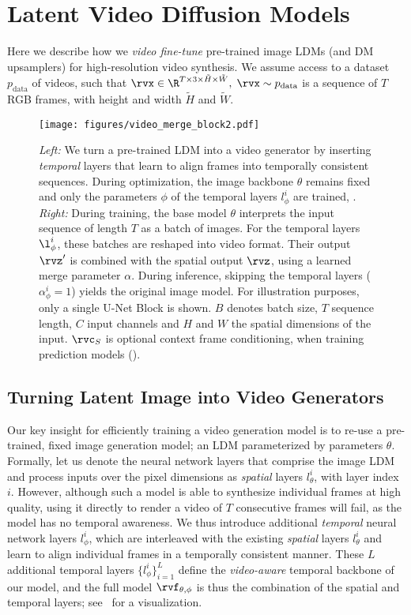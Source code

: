 \section{Latent Video Diffusion Models}\label{sec:video_ldm}
Here we describe how we \emph{video fine-tune} pre-trained image LDMs (and DM upsamplers) for high-resolution video synthesis. We assume access to a dataset $p_{\text{data}}$ of videos, such that $\rvx \in \R^{T \times 3 \times \tilde{H} \times \tilde{W}}, \; \rvx \sim p_{\text{data}}$ is a sequence of $T$ RGB frames, with height and width $\tilde{H}$ and $\tilde{W}$.
\begin{figure}[t!]
  \vspace{-0.3cm}
    \texttt{[image: figures/video\_merge\_block2.pdf]}
    \caption{\small \textit{Left:} We turn a pre-trained LDM into a video generator by inserting \emph{temporal} layers that learn to align frames into temporally consistent sequences. During optimization, the image backbone $\theta$ remains fixed and only the parameters $\phi$ of the temporal layers $l_\phi^i$ are trained, \cf {}. \textit{Right:}
During training, the base model $\theta$ interprets the input sequence of length $T$ as a batch of images. For the temporal layers $\l_\phi^i$, these batches are reshaped into video format. Their output $\rvz'$ is combined with the spatial output $\rvz$, using a learned merge parameter $\alpha$.
During inference, skipping the temporal layers ($\alpha_\phi^i{=}1$)  yields the original image model.
    For illustration purposes, only a single U-Net Block is shown.
    $B$ denotes batch size, $T$ sequence length, $C$ input channels and $H$ and $W$ the spatial dimensions of the input. $\rvc_S$ is optional context frame conditioning, when training prediction models ().
    } 
    \label{fig:architecture}

   \vspace{-5.5mm}
\end{figure}\subsection{Turning Latent Image into Video Generators}
\label{sec:turning}
Our key insight for efficiently training a video generation model is to re-use a pre-trained, fixed image generation model; an LDM parameterized by parameters $\theta$. Formally, let us denote the neural network layers that comprise the image LDM and process inputs over the pixel dimensions as \emph{spatial} layers $l_\theta^i$, with layer index $i$.
However, although such a model is able to synthesize individual frames at high quality, using it directly to render a video of $T$ consecutive frames will fail, as the model has no temporal awareness. 
We thus introduce additional \emph{temporal} neural network layers $l_\phi^i$, which are interleaved with the existing \emph{spatial} layers $l_\theta^i$ and learn to align individual frames in a temporally consistent manner. These $L$ additional temporal layers $\{l_\phi^i\}_{i=1}^L$ define the \emph{video-aware} temporal backbone of our model, and the full model $\rvf_{\theta, \phi}$ is thus the combination of the spatial and temporal layers; see~ for a visualization.


